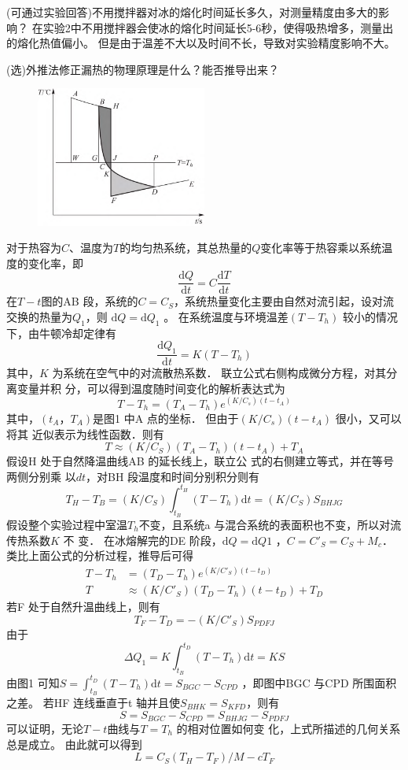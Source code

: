 \documentclass[dvipsnames, svgnames,a4paper,11pt]{article}
\renewcommand{\d}{\mathrm{d}}
\begin{document}
\begin{question}
	(可通过实验回答)不用搅拌器对冰的熔化时间延长多久，对测量精度由多大的影响？
	\tcblower
	在实验2中不用搅拌器会使冰的熔化时间延长5-6秒，使得吸热增多，测量出的熔化热值偏小。
	但是由于温差不大以及时间不长，导致对实验精度影响不大。
\end{question}

\begin{question}
	(选)外推法修正漏热的物理原理是什么？能否推导出来？
	\tcblower
	\begin{figure}[H]
		\includegraphics[width=0.5\textwidth]{yuxi.png}
	\end{figure}
	对于热容为$C$、温度为$T$的均匀热系统，其总热量的$Q$变化率等于热容乘以系统温度的变化率，即
$$\frac{\d Q}{\d t}=C\frac{\d T}{\d t}$$
在$T-t $图的AB 段，系统的$C = C_S$，系统热量变化主要由自然对流引起，设对流交换的热量为$Q_1$，则
$\d Q= \d Q_1$ 。 在系统温度与环境温差$( T-T_h) $
较小的情况下，由牛顿冷却定律有
$$\frac{\d Q_1}{\d t}=K(T-T_h)$$
其中，$K$ 为系统在空气中的对流散热系数． 联立公式右侧构成微分方程，对其分离变量并积
分，可以得到温度随时间变化的解析表达式为
$$T-T_h=(T_A-T_h)e^{(K/C_s)(t-t_A)}$$
其中，$( t_A，T_A) $是图1 中A 点的坐标． 但由于$(K/C_s)(t-t_A)$
很小，又可以将其 近似表示为线性函数．则有
$$T\approx (K/C_S)(T_A-T_h)(t-t_A)+T_A$$
假设H 处于自然降温曲线AB 的延长线上，联立公
式的右侧建立等式，并在等号两侧分别乘
以$dt$，对BH 段温度和时间分别积分则有
$$T_H-T_B=(K/C_S)\int_{t_B}^{t_H}(T-T_h)\d t=(K/C_S)S_{BHJG}$$
假设整个实验过程中室温$T_h$不变，且系统a 与混合系统的表面积也不变，所以对流传热系数$K$ 不
变． 在冰熔解完的DE 阶段，$\d Q = \d Q1$
，$C = C'_S = C_S +M_c$． 类比上面公式的分析过程，推导后可得
$$\begin{aligned}
	T-T_h&=(T_D-T_h)e^{(K/C'_S)(t-t_D)}\\
	T&\approx (K/C'_S)(T_D-T_h)(t-t_D)+T_D
\end{aligned}$$
若F 处于自然升温曲线上，则有
$$T_F-T_D=-(K/C'_S)S_{PDFJ}$$
由于
$$\Delta Q_1=K\int_{t_B}^{t_D}(T-T_h)\d t=KS$$
由图1 可知$S=\int_{t_B}^{t_D}(T-T_h)\d t=S_{BGC}-S_{CPD}$
，即图中BGC 与CPD 所围面积之差。
若HF 连线垂直于t 轴并且使$S_{BHK}=S_{KFD}$，则有
$$S=S_{BGC}-S_{CPD}=S_{BHJG}-S_{PDFJ}$$
可以证明，无论$T-t$曲线与$T = T_h$
的相对位置如何变
化，上式所描述的几何关系总是成立。
由此就可以得到
$$L=C_S(T_H-T_F)/M-cT_F$$
\end{question}
\end{document}
